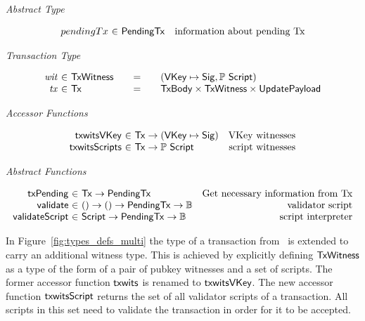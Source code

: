 \documentclass[11pt,a4paper,dvipsnames]{article}
\newcommand{\Bool}{\ensuremath{\mathbb{B}}}
\newcommand{\Tx}{\type{Tx}}
\newcommand{\TxWitness}{\type{TxWitness}}
\newcommand{\TxBody}{\type{TxBody}}
\newcommand{\UpdatePayload}{\type{UpdatePayload}}
\newcommand{\Script}{\type{Script}}
\newcommand{\PendingTx}{\type{PendingTx}}
\newcommand{\VKey}{\type{VKey}}
\newcommand{\Sig}{\type{Sig}}
\theoremstyle{definition}
\begin{document}
\begin{figure*}[hbt]
  \emph{Abstract Type}

  \begin{equation*}
    \begin{array}{r@{~\in~}lr}
      pendingTx & \PendingTx & \text{information about pending Tx}
    \end{array}
  \end{equation*}

  \emph{Transaction Type}

  \begin{equation*}
    \begin{array}{r@{~\in~}l@{\qquad=\qquad}l}
      \var{wit} & \TxWitness & (\VKey \mapsto \Sig, \powerset \Script)
      \\
      \var{tx}
      & \Tx
      & \TxBody \times \TxWitness \times \UpdatePayload
      \\
    \end{array}
  \end{equation*}

  \emph{Accessor Functions}

  \begin{equation*}
    \begin{array}{r@{~\in~}lr}
      \fun{txwitsVKey} & \Tx \to (\VKey \mapsto \Sig) & \text{VKey witnesses} \\
      \fun{txwitsScripts} & \Tx \to \powerset{\Script} & \text{script witnesses}
    \end{array}
  \end{equation*}

  \emph{Abstract Functions}

  \begin{equation*}
    \begin{array}{r@{~\in~}lr}
      \fun{txPending} & \Tx \to \PendingTx & \text{Get necessary information from Tx} \\
      \fun{validate} & () \to () \to \PendingTx \to \Bool & \text{validator script}\\
      \fun{validateScript} & \Script \to \PendingTx \to \Bool & \text{script interpreter}
    \end{array}
  \end{equation*}
  \caption{Types for Transaction Inputs with Scripts}
  \label{fig:types_defs_multi}
\end{figure*}

In Figure~\ref{fig:types_defs_multi} the type of a transaction
from~\cite{shelley_formal_spec} is extended to carry an additional witness
type. This is achieved by explicitly defining $\TxWitness$ as a type of the form
of a pair of pubkey witnesses and a set of scripts. The former accessor function
$\mathsf{txwits}$ is renamed to $\mathsf{txwitsVKey}$. The new accessor function
$\mathsf{txwitsScript}$ returns the set of all validator scripts of a
transaction. All scripts in this set need to validate the transaction in order
for it to be accepted.
\end{document}

